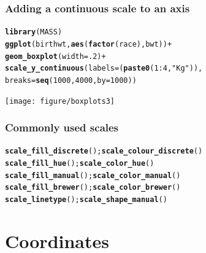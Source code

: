 \documentclass{beamer}\usepackage[]{graphicx}\usepackage[]{color}
\makeatletter
\newcommand{\hlstr}[1]{\textcolor[rgb]{0.192,0.494,0.8}{#1}}%
\newcommand{\hlkwd}[1]{\textcolor[rgb]{0.737,0.353,0.396}{\textbf{#1}}}%
\newenvironment{kframe}{%
 \def\at@end@of@kframe{}%
 \ifinner\ifhmode%
  \def\at@end@of@kframe{\end{minipage}}%
  \begin{minipage}{\columnwidth}%
 \fi\fi%
 \def\FrameCommand##1{\hskip\@totalleftmargin \hskip-\fboxsep
 \colorbox{shadecolor}{##1}\hskip-\fboxsep
     \hskip-\linewidth \hskip-\@totalleftmargin \hskip\columnwidth}%
 \MakeFramed {\advance\hsize-\width
   \@totalleftmargin\z@ \linewidth\hsize
   \@setminipage}}%
 {\par\unskip\endMakeFramed%
 \at@end@of@kframe}
\newenvironment{knitrout}{}{} %
\makeatother
\begin{document}
\begin{frame}[fragile]
\frametitle{Adding a continuous scale to an axis}
\begin{knitrout}\footnotesize
{}\color{fgcolor}\begin{kframe}
\begin{alltt}
\hlkwd{library}(MASS)
\hlkwd{ggplot}(birthwt, \hlkwd{aes}(\hlkwd{factor}(race), bwt)) +
\hlkwd{geom_boxplot}(width = .2) +
\hlkwd{scale_y_continuous}(labels = (\hlkwd{paste0}(1:4, \hlstr{" Kg"})),
breaks = \hlkwd{seq}(1000, 4000, by = 1000))
\end{alltt}
\end{kframe}

{\centering \texttt{[image: figure/boxplots3]} 

}



\end{knitrout}

\end{frame}


\begin{frame}[fragile]
\frametitle{Commonly used scales}
\begin{knitrout}\footnotesize
{}\color{fgcolor}\begin{kframe}
\begin{alltt}
\hlkwd{scale_fill_discrete}(); \hlkwd{scale_colour_discrete}()
\hlkwd{scale_fill_hue}(); \hlkwd{scale_color_hue}()
\hlkwd{scale_fill_manual}();  \hlkwd{scale_color_manual}()
\hlkwd{scale_fill_brewer}(); \hlkwd{scale_color_brewer}()
\hlkwd{scale_linetype}(); \hlkwd{scale_shape_manual}()
\end{alltt}
\end{kframe}
\end{knitrout}

\end{frame}


\section*{Coordinates}
\frame{\sectionpage}

\end{document}
